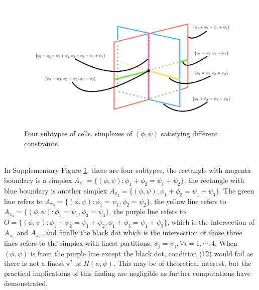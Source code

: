 \documentclass[aoas,preprint]{imsart}
\begin{document}
\begin{figure}[h]
\includegraphics[scale = 0.5]{Figs/overlap.png}
 \caption{Four subtypes of cells,  simplexes of $(\phi,\psi)$ satisfying different constraints.}
  \label{fig:issue}
\end{figure}
\hfill\\
In Supplementary Figure \ref{fig:issue}, there are four subtypes, the rectangle with magenta boundary is a simplex $A_{\pi_1} = \{(\phi,\psi) : \phi_1 + \phi_2 = \psi_1 + \psi_2\}$, the rectangle with blue boundary is another simplex $A_{\pi_2} = \{(\phi,\psi) : \phi_1 + \phi_3 = \psi_1 + \psi_3\}$. The green line refers to $A_{\pi_3} = \{(\phi,\psi) : \phi_1 = \psi_1, \phi_2 = \psi_2\}$, the yellow line refers to $A_{\pi_4} = \{(\phi,\psi) : \phi_1 = \psi_1, \phi_3 = \psi_3\}$.  
the purple line refers to $O = \{(\phi,\psi) : \phi_1 + \phi_2 = \psi_1 + \psi_2, \phi_1 + \phi_3 = \psi_1 + \psi_3\}$, which is the intersection of $A_{\pi_1}$ and $A_{\pi_2}$, 
and finally the black dot which is the intersection of those three lines refers to the simplex with finest partitions, $\phi_i = \psi_i, \forall i = 1,\cdots,4$.  When $(\phi,\psi)$ is from the purple line except the black dot, condition (12) would fail as there is not a finest $\pi^*$ of $H(\phi,\psi)$.  
This may be of theoretical interest, but the 
practical implications of this finding are negligible as further computations have demonstrated.
\end{document}
